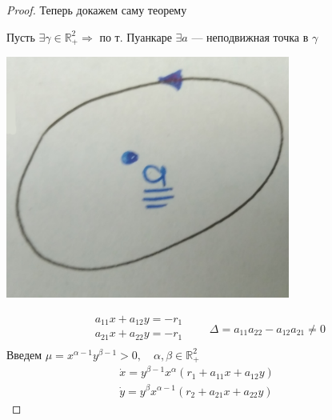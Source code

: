 	\begin{proof}{ Теперь докажем саму теорему} \vspace{3mm}
	
		Пусть $\exists \gamma \in \mathbb{R}^2_+ \Rightarrow$ по т. Пуанкаре $\exists a$ --- неподвижная точка 
		в $\gamma$ 
		\newline
		
		\begin{minipage}{0.3\textwidth}
			\begin{center} \includegraphics[width=0.7\textwidth]{ch8/pict/pict_6.png} \vspace{3mm}\end{center} 
		\end{minipage}
		\begin{minipage}{0.68\textwidth}
			$$
				\begin{gathered}
					a_{11}x + a_{12}y = -r_1 \\
					a_{21}x + a_{22}y = -r_1 \\
				\end{gathered} \qquad  \Delta = a_{11}a_{22} - a_{12}a_{21} \neq 0
			$$ \cntrKul Введем $\mu = x^{\alpha-1}y^{\beta -1}>0, \quad \alpha, \beta \in \mathbb{R}^2_+$ \cntrKul
			\begin{equation}
				\begin{gathered}
						\dot{x} = y^{\beta -1} x^{\alpha}(r_1 + a_{11}x + a_{12}y) \\
						\dot{y} = y^{\beta} x^{\alpha-1}(r_2 + a_{21}x + a_{22}y) 
				\end{gathered}\label{ch10_orb_eq} \qquad 
		\end{equation}
		\end{minipage}		
		

\end{proof}
